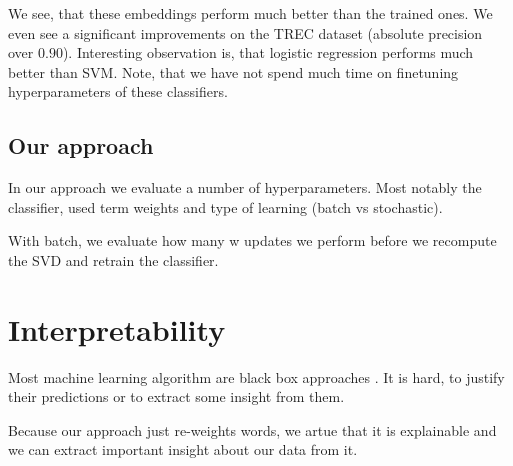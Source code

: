     
    We see, that these embeddings perform much better than the trained ones. 
    We even see a significant improvements on the TREC dataset (absolute precision over $0.90$).
    Interesting observation is, that logistic regression performs much better than SVM.
    Note, that we have not spend much time on finetuning hyperparameters of these classifiers. 

    
    \subsection{Our approach}
    
    In our approach we evaluate a number of hyperparameters. Most notably the classifier, used term weights and type of learning (batch vs stochastic).
    
    With batch, we evaluate how many w updates we perform before we recompute the SVD and retrain the classifier.
    

    


\section{Interpretability}
    Most machine learning algorithm are black box approaches \cite{ribeiro2016should}. %
    It is hard, to justify their predictions or to extract some insight from them. 
    
    Because our approach just re-weights words, we artue that it is explainable and we can extract important insight about our data from it.

